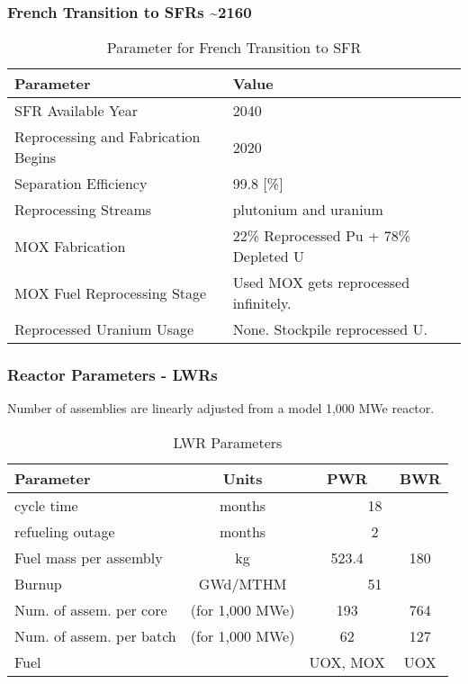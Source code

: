 \begin{frame}
    \frametitle{French Transition to SFRs \textasciitilde 2160}
    
\begin{table}[h]
    \centering
    \begin{tabularx}{\textwidth}{bb}
        \hline
        Parameter & Value \\
        \hline
        \gls{SFR} Available Year & 2040 \\
        Reprocessing and Fabrication Begins & 2020 \\
        Separation Efficiency & 99.8 [\%] \\
        Reprocessing Streams & plutonium and uranium \\
        \gls{MOX} Fabrication &  \small{22\% Reprocessed Pu + 78\% Depleted U}  \\
        \gls{MOX} Fuel Reprocessing Stage &  Used \gls{MOX} gets reprocessed infinitely. \\
        Reprocessed Uranium Usage &  None. Stockpile reprocessed U. \\
        \hline
    \end{tabularx}
    \caption {Parameter for French Transition to \gls{SFR}}
    \label{tab:sim_france}
\end{table}

\end{frame}


\begin{frame}
    \frametitle{Reactor Parameters - \glspl{LWR} }
    Number of assemblies are linearly adjusted from a model 1,000 MWe reactor.
    \begin{table}[h]
    \centering
    \begin{tabularx}{\textwidth}{bccc}
        \hline
        Parameter & Units & PWR & BWR \\
        \hline
        cycle time & months & \multicolumn{2}{c}{18}   \\ 
        refueling outage & months & \multicolumn{2}{c}{2}\\
        Fuel mass per assembly & kg & 523.4 & 180 \\
        Burnup & GWd/MTHM & \multicolumn{2}{c}{51} \\
        \small{Num. of assem. per core} & (for 1,000 MWe) & 193  & 764 \\
        \small{Num. of assem. per batch} & (for 1,000 MWe) & 62 & 127 \\
        Fuel & & \gls{UOX}, \gls{MOX} & \gls{UOX}  \\
        \hline
    \end{tabularx}
    \caption {\gls{LWR} Parameters}
    \label{tab:lwr}
    \end{table}
\end{frame}


